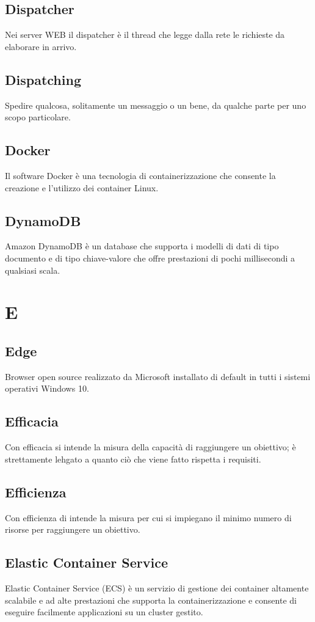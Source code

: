 \subsection{Dispatcher}  Nei server WEB il dispatcher è il thread che legge dalla rete le richieste da elaborare in arrivo.
\subsection{Dispatching}  Spedire qualcosa, solitamente un messaggio o un bene, da qualche parte per uno scopo particolare.
\subsection{Docker}  Il software Docker è una tecnologia di containerizzazione che consente la creazione e l'utilizzo dei container Linux.
\subsection{DynamoDB}  Amazon DynamoDB è un database che supporta i modelli di dati di tipo documento e di tipo chiave-valore che offre prestazioni di pochi millisecondi a qualsiasi scala.

\newpage \section{E}
\subsection{Edge}  Browser open source realizzato da Microsoft installato di default in tutti i sistemi operativi Windows 10.
\subsection{Efficacia}  Con efficacia si intende la misura della capacità di raggiungere un obiettivo; è strettamente lehgato a quanto ciò che viene fatto rispetta i requisiti.
\subsection{Efficienza}  Con efficienza di intende la misura per cui si impiegano il minimo numero di risorse per raggiungere un obiettivo.
\subsection{Elastic Container Service}  Elastic Container Service (ECS) è un servizio di gestione dei container altamente scalabile e ad alte prestazioni che supporta la containerizzazione e consente di eseguire facilmente applicazioni su un cluster gestito.
